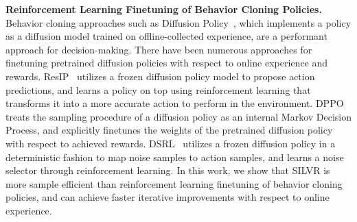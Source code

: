 \textbf{Reinforcement Learning Finetuning of Behavior Cloning Policies.}
Behavior cloning approaches such as Diffusion Policy~\citep{chi2023diffusionpolicy}, which implements a policy as a diffusion model trained on offline-collected experience, are a performant approach for decision-making.  There have been numerous approaches for finetuning pretrained diffusion policies with respect to online experience and rewards.  ResIP~\citep{ankile2025imitation} utilizes a frozen diffusion policy model to propose action predictions, and learns a policy on top using reinforcement learning that transforms it into a more accurate action to perform in the environment.  DPPO~\citep{ren2024diffusion} treats the sampling procedure of a diffusion policy as an internal Markov Decision Process, and explicitly finetunes the weights of the pretrained diffusion policy with respect to achieved rewards.  DSRL~\citep{wagenmaker2025steering} utilizes a frozen diffusion policy in a deterministic fashion to map noise samples to action samples, and learns a noise selector through reinforcement learning.  In this work, we show that SILVR is more sample efficient than reinforcement learning finetuning of behavior cloning policies, and can achieve faster iterative improvements with respect to online experience.
